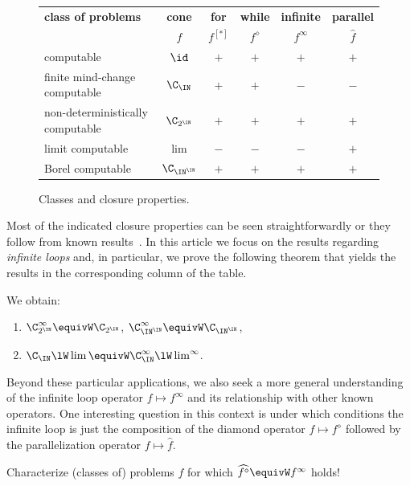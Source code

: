\documentclass{lmcs}
\begin{document}
\begin{figure}[htb]
\centering
\begin{tabular}{l|c|cccc}
{\bf class of problems} & {\bf cone} & {\bf for} & {\bf while} & {\bf infinite} & {\bf parallel}\\
& $f$ & $f^{[*]}$ & $f^\diamond$ & $f^\infty$ & $\widehat{f}$\\\hline
computable & $\id$ & $+$ & $+$ & $+$ & $+$ \\
finite mind-change computable & $\C_\IN$ & $+$ & $+$ & $-$ & $-$ \\
non-deterministically computable & $\C_{2^\IN}$ & $+$ & $+$ & $+$ & $+$ \\
limit computable & $\lim$ & $-$ & $-$ & $-$ & $+$ \\
Borel computable & $\C_{\IN^\IN}$ & $+$ & $+$ & $+$ & $+$
\end{tabular}
\caption{Classes and closure properties.}
\end{figure} 

\noindent
Most of the indicated closure properties can be seen straightforwardly or they follow from known results~\cite{BGP21}.
In this article we focus on the results regarding {\em infinite loops} and, in particular, we prove the following theorem
that yields the results in the corresponding column of the table.

\begin{thm}
\label{thm:infinite-loops}
We obtain:
\begin{enumerate}
\item $\C_{2^\IN}^\infty\equivW\C_{2^\IN}$, $\C_{\IN^\IN}^\infty\equivW\C_{\IN^\IN}$,
\item $\C_{\IN}\lW\lim\equivW\C_{\IN}^\infty\lW\lim^\infty$.
\end{enumerate}
\end{thm}

\noindent
Beyond these particular applications, we also seek a more general understanding of the infinite loop operator $f \mapsto f^\infty$ and its relationship with other known operators. One interesting question in this context is under
which conditions the infinite loop is just the composition of the diamond operator $f\mapsto f^\diamond$ 
followed by the parallelization operator $f\mapsto\widehat{f}$.

\begin{question}
\label{question}
Characterize (classes of) problems $f$ for which $\widehat{f^\diamond}\equivW f^\infty$ holds!
\end{question}
\end{document}
